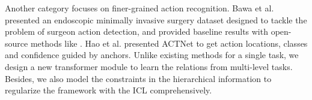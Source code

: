Another category focuses on finer-grained action recognition. Bawa et al. \cite{bawa2021saras} presented an endoscopic minimally invasive surgery dataset designed to tackle the problem of surgeon action detection, and provided baseline results with open-source methods like \cite{ren2015faster}. Hao et al. \cite{hao2023act}  presented ACTNet to get action locations, classes and confidence guided by anchors. Unlike existing methods for a single task, we design a new transformer module to learn the relations from multi-level tasks. Besides, we also model the constraints in the hierarchical information to regularize the framework with the ICL comprehensively.

